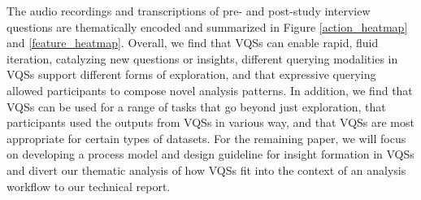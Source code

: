 \par The audio recordings and transcriptions of pre- and post-study interview questions are thematically encoded and summarized in Figure \ref{action_heatmap} and \ref{feature_heatmap}. Overall, we find that VQSs can enable rapid, fluid iteration, catalyzing new questions or insights, different querying modalities in VQSs support different forms of exploration, and that expressive querying allowed participants to compose novel analysis patterns. In addition, we find that VQSs can be used for a range of tasks that go beyond just exploration, that participants used the outputs from VQSs in various way, and that VQSs are most appropriate for certain types of datasets. For the remaining paper, we will focus on developing a process model and design guideline for insight formation in VQSs and divert our thematic analysis of how VQSs fit into the context of an analysis workflow to our technical report.

